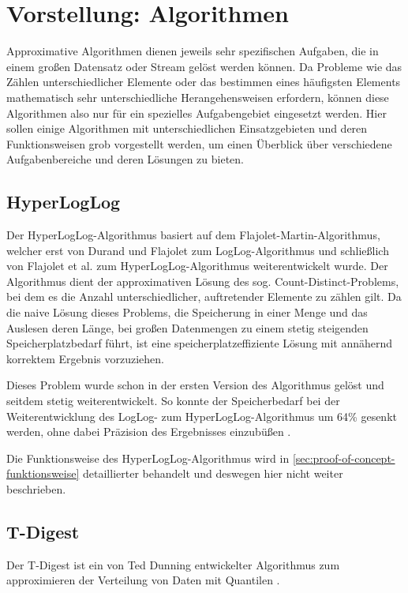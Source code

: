 \section{Vorstellung: Algorithmen}

Approximative Algorithmen dienen jeweils sehr spezifischen Aufgaben, die in einem großen Datensatz oder Stream gelöst werden können.
Da Probleme wie das Zählen unterschiedlicher Elemente oder das bestimmen eines häufigsten Elements mathematisch sehr unterschiedliche Herangehensweisen erfordern, können diese Algorithmen also nur für ein spezielles Aufgabengebiet eingesetzt werden.
Hier sollen einige Algorithmen mit unterschiedlichen Einsatzgebieten und deren Funktionsweisen grob vorgestellt werden, um einen Überblick über verschiedene Aufgabenbereiche und deren Lösungen zu bieten.

\subsection{HyperLogLog}

Der HyperLogLog-Algorithmus basiert auf dem Flajolet-Martin-Algorithmus, welcher erst von Durand und Flajolet \cite{durand2003} zum LogLog-Algorithmus und schließlich von Flajolet et al. \cite{flajolet2007} zum HyperLogLog-Algorithmus weiterentwickelt wurde.
Der Algorithmus dient der approximativen Lösung des sog. Count-Distinct-Problems, bei dem es die Anzahl unterschiedlicher, auftretender Elemente zu zählen gilt.
Da die naive Lösung dieses Problems, die Speicherung in einer Menge und das Auslesen deren Länge, bei großen Datenmengen zu einem stetig steigenden Speicherplatzbedarf führt, ist eine speicherplatzeffiziente Lösung mit annähernd korrektem Ergebnis vorzuziehen.

Dieses Problem wurde schon in der ersten Version des Algorithmus gelöst und seitdem stetig weiterentwickelt.
So konnte der Speicherbedarf bei der Weiterentwicklung des LogLog- zum HyperLogLog-Algorithmus um 64\% gesenkt werden, ohne dabei Präzision des Ergebnisses einzubüßen \cite{flajolet2007}.

Die Funktionsweise des HyperLogLog-Algorithmus wird in \autoref{sec:proof-of-concept-funktionsweise} detaillierter behandelt und deswegen hier nicht weiter beschrieben.

\subsection{T-Digest}

Der T-Digest ist ein von Ted Dunning entwickelter Algorithmus zum approximieren der Verteilung von Daten mit Quantilen \cite{dunning2019}.

